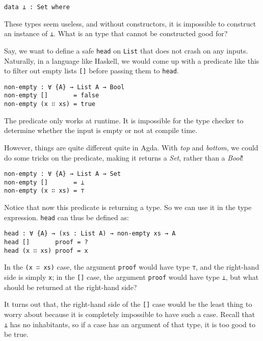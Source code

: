 \documentclass[\main/thesis.tex]{subfiles}
\begin{document}
\begin{lstlisting}
data ⊥ : Set where
\end{lstlisting}

These types seem useless, and without constructors, it is impossible to
construct an instance of {\lstinline|⊥|}. What is an type that cannot be
constructed good for?

Say, we want to define a safe {\lstinline|head|} on {\lstinline|List|} that
does not crash on any inputs. Naturally, in a language like Haskell,
we would come up with a predicate like this to filter out empty lists
{\lstinline|[]|} before passing them to {\lstinline|head|}.

\begin{lstlisting}
non-empty : ∀ {A} → List A → Bool
non-empty []       = false
non-empty (x ∷ xs) = true
\end{lstlisting}

The predicate only works at runtime. It is impossible for the type
checker to determine whether the input is empty or not at compile time.

However, things are quite different quite in Agda. With \textit{top} and \textit{bottom},
we could do some tricks on the predicate, making it returns a \textit{Set}, rather
than a \textit{Bool}!

\begin{lstlisting}
non-empty : ∀ {A} → List A → Set
non-empty []       = ⊥
non-empty (x ∷ xs) = ⊤
\end{lstlisting}

Notice that now this predicate is returning a type. So we can use it in the type
expression. {\lstinline|head|} can thus be defined as:

\begin{lstlisting}
head : ∀ {A} → (xs : List A) → non-empty xs → A
head []       proof = ?
head (x ∷ xs) proof = x
\end{lstlisting}

In the {\lstinline|(x ∷ xs)|} case, the argument {\lstinline|proof|} would
have type {\lstinline|⊤|}, and the right-hand side is simply {\lstinline|x|};
in the {\lstinline|[]|} case, the argument {\lstinline|proof|} would
have type {\lstinline|⊥|}, but what should be returned at the right-hand side?

It turns out that, the right-hand side of the {\lstinline|[]|} case would be the
least thing to worry about because it is completely impossible to have such a case.
Recall that {\lstinline|⊥|} has no inhabitants, so if a case has an argument of
that type, it is too good to be true.
\end{document}
